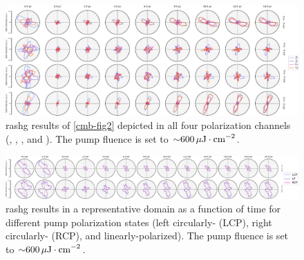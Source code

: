 \begin{landscape}
\begin{figure}
\centering
\includegraphics[width=\textwidth]{./gfx/ch6/full_fig2.pdf}
\caption[Full nonequilibrium  results in \cmb]{\label{cmb-fullnonequilibrium}\gls{rashg} results of \cref{cmb-fig2} depicted in all four polarization channels (\PP, \PS, \SP, and \SS).
The pump fluence is set to ${\sim} \qty{600}{\mu J \cdot cm^{-2}}$.}
\end{figure}
\end{landscape}

\begin{landscape}
\begin{figure}
\centering
\includegraphics[width=\textwidth]{./gfx/ch6/polarization.pdf}
\caption[Polarization dependence of  results]{\label{cmb-polarization}\gls{rashg} results in a representative domain as a function of time for different pump polarization states (left circularly- (LCP), right circularly- (RCP), and linearly-polarized).
The pump fluence is set to ${\sim} \qty{600}{\mu J \cdot cm^{-2}}$.
}
\end{figure}
\end{landscape}

